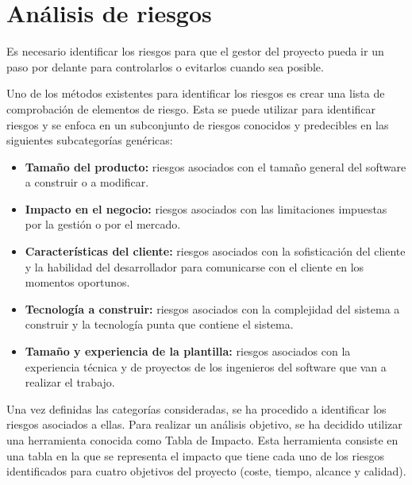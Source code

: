 \section{Análisis de riesgos}
\par Es necesario identificar los riesgos para que el gestor del proyecto pueda ir un paso por delante para controlarlos o evitarlos cuando sea posible.
\par Uno de los métodos existentes para identificar los riesgos es crear una lista de comprobación de elementos de riesgo. Esta se puede utilizar para identificar riesgos y se enfoca en un subconjunto de riesgos conocidos y predecibles en las siguientes subcategorías genéricas:

\begin{itemize}[-]
\item \textbf{Tamaño del producto:} riesgos asociados con el tamaño general del software a construir o a modificar.
\item \textbf{Impacto en el negocio:} riesgos asociados con las limitaciones impuestas por la gestión o por el mercado.
\item \textbf{Características del cliente:} riesgos asociados con la sofisticación del cliente y la habilidad del desarrollador para comunicarse con el cliente en los momentos oportunos.
\item \textbf{Tecnología a construir:} riesgos asociados con la complejidad del sistema a construir y la tecnología punta que contiene el sistema.
\item \textbf{Tamaño y experiencia de la plantilla:} riesgos asociados con la experiencia técnica y de proyectos de los ingenieros del software que van a realizar el trabajo.
\end{itemize}

\par Una vez definidas las categorías consideradas, se ha procedido a identificar los riesgos asociados a ellas. Para realizar un análisis objetivo, se ha decidido utilizar una herramienta conocida como Tabla de Impacto. Esta herramienta consiste en una tabla en la que se representa el impacto que tiene cada uno de los riesgos identificados para cuatro objetivos del proyecto (coste, tiempo, alcance y calidad).

